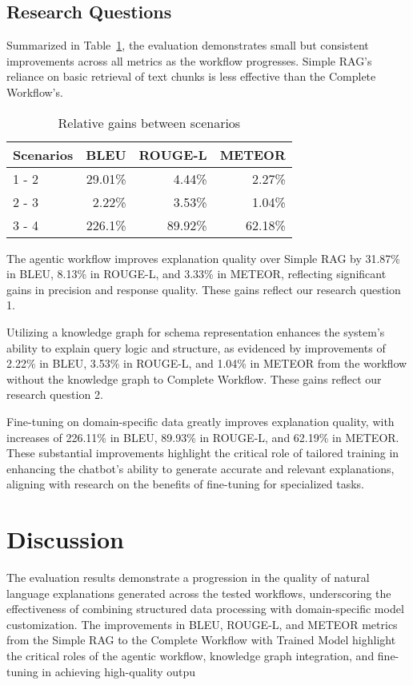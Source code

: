 \documentclass[11pt]{article}
\begin{document}
\subsection{Research Questions}

Summarized in Table~\ref{tab:relative-gains}, the evaluation demonstrates small but consistent improvements across all metrics as the workflow progresses. Simple RAG’s reliance on basic retrieval of text chunks is less effective than the Complete Workflow’s.

\begin{table}[ht]
\centering
\begin{tabular}{lrrr}
\toprule
\textbf{Scenarios} & \textbf{BLEU} & \textbf{ROUGE-L} & \textbf{METEOR} \\
\midrule
1 - 2 & 29.01\% & 4.44\% & 2.27\% \\
2 - 3 & 2.22\% & 3.53\% & 1.04\% \\
3 - 4 & 226.1\% & 89.92\% & 62.18\% \\
\bottomrule
\end{tabular}
\centering
\caption{Relative gains between scenarios}
\label{tab:relative-gains}
\end{table}

The agentic workflow improves explanation quality over Simple RAG by 31.87\% in BLEU, 8.13\% in ROUGE-L, and 3.33\% in METEOR, reflecting significant gains in precision and response quality. These gains reflect our research question 1.

Utilizing a knowledge graph for schema representation enhances the system’s ability to explain query logic and structure, as evidenced by improvements of 2.22\% in BLEU, 3.53\% in ROUGE-L, and 1.04\% in METEOR from the workflow without the knowledge graph to Complete Workflow. These gains reflect our research question 2.

Fine-tuning on domain-specific data greatly improves explanation quality, with increases of 226.11\% in BLEU, 89.93\% in ROUGE-L, and 62.19\% in METEOR. These substantial improvements highlight the critical role of tailored training in enhancing the chatbot’s ability to generate accurate and relevant explanations, aligning with research on the benefits of fine-tuning for specialized tasks.

\section{Discussion}

The evaluation results demonstrate a progression in the quality of natural language explanations generated across the tested workflows, underscoring the effectiveness of combining structured data processing with domain-specific model customization. The improvements in BLEU, ROUGE-L, and METEOR metrics from the Simple RAG to the Complete Workflow with Trained Model highlight the critical roles of the agentic workflow, knowledge graph integration, and fine-tuning in achieving high-quality outpu
\end{document}
